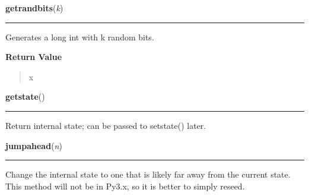     \vspace{0.5ex}

\hspace{.8\funcindent}\begin{boxedminipage}{\funcwidth}

    \raggedright \textbf{getrandbits}(\textit{k})

    \vspace{-1.5ex}

    \rule{\textwidth}{0.5\fboxrule}
\setlength{\parskip}{2ex}
    Generates a long int with k random bits.

\setlength{\parskip}{1ex}
      \textbf{Return Value}
    \vspace{-1ex}

      \begin{quote}
      x

      \end{quote}

    \end{boxedminipage}

    \label{random:getstate}

    \vspace{0.5ex}

\hspace{.8\funcindent}\begin{boxedminipage}{\funcwidth}

    \raggedright \textbf{getstate}()

    \vspace{-1.5ex}

    \rule{\textwidth}{0.5\fboxrule}
\setlength{\parskip}{2ex}
    Return internal state; can be passed to setstate() later.

\setlength{\parskip}{1ex}
    \end{boxedminipage}

    \label{random:jumpahead}

    \vspace{0.5ex}

\hspace{.8\funcindent}\begin{boxedminipage}{\funcwidth}

    \raggedright \textbf{jumpahead}(\textit{n})

    \vspace{-1.5ex}

    \rule{\textwidth}{0.5\fboxrule}
\setlength{\parskip}{2ex}
    Change the internal state to one that is likely far away from the 
    current state.  This method will not be in Py3.x, so it is better to 
    simply reseed.

\setlength{\parskip}{1ex}
    \end{boxedminipage}

